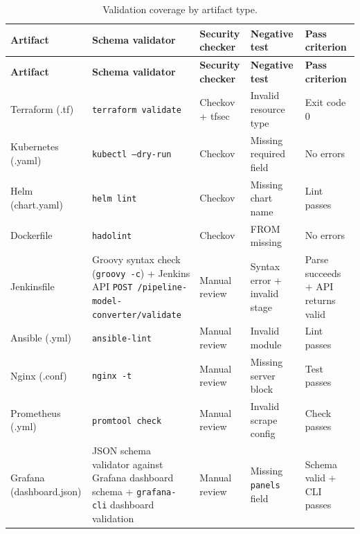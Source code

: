 \begin{longtable}{@{}p{}p{}p{}p{}p{}@{}}
\caption{Validation coverage by artifact type.}\label{tab:validation}\\
\toprule
\textbf{Artifact} & \textbf{Schema validator} & \textbf{Security checker} &
  \textbf{Negative test} & \textbf{Pass criterion} \\
\midrule
\endfirsthead
\toprule
\textbf{Artifact} & \textbf{Schema validator} & \textbf{Security checker} &
  \textbf{Negative test} & \textbf{Pass criterion} \\
\midrule
\endhead

Terraform (.tf) &
  \texttt{terraform validate} & Checkov + tfsec &
  Invalid resource type & Exit code 0 \\

Kubernetes (.yaml) &
  \texttt{kubectl --dry-run} & Checkov &
  Missing required field & No errors \\

Helm (chart.yaml) &
  \texttt{helm lint} & Checkov &
  Missing chart name & Lint passes \\

Dockerfile &
  \texttt{hadolint} & Checkov &
  FROM missing & No errors \\

Jenkinsfile &
  Groovy syntax check (\texttt{groovy -c}) + Jenkins API
  \texttt{POST /pipeline-model-converter/validate} &
  Manual review &
  Syntax error + invalid stage & Parse succeeds + API returns valid \\

Ansible (.yml) &
  \texttt{ansible-lint} & Manual review &
  Invalid module & Lint passes \\

Nginx (.conf) &
  \texttt{nginx -t} & Manual review &
  Missing server block & Test passes \\

Prometheus (.yml) &
  \texttt{promtool check} & Manual review &
  Invalid scrape config & Check passes \\

Grafana (dashboard.json) &
  JSON schema validator against Grafana dashboard schema +
  \texttt{grafana-cli} dashboard validation &
  Manual review &
  Missing \texttt{panels} field & Schema valid + CLI passes \\

\bottomrule
\end{longtable}


